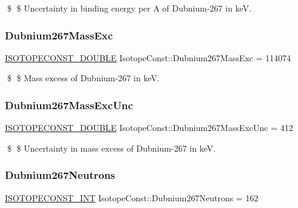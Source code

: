 \$ \$ Uncertainty in binding energy per A of Dubnium-\/267 in keV. \mbox{\label{group___isotope_const-_dubnium-_db267_ga7fd38a8ca58996b056b71a1d2e3cdb38}} 
\subsubsection{\texorpdfstring{Dubnium267\+Mass\+Exc}{Dubnium267MassExc}}
{\footnotesize\ttfamily \mbox{\hyperlink{group___isotope_const-_macros_ga8f45a7272ce02c0b4c65c44636ed719a}{I\+S\+O\+T\+O\+P\+E\+C\+O\+N\+S\+T\+\_\+\+D\+O\+U\+B\+LE}} Isotope\+Const\+::\+Dubnium267\+Mass\+Exc = 114074}

\$ \$ Mass excess of Dubnium-\/267 in keV. \mbox{\label{group___isotope_const-_dubnium-_db267_gad4cf3b018f2bd5d7bee70d825d6aa78c}} 
\subsubsection{\texorpdfstring{Dubnium267\+Mass\+Exc\+Unc}{Dubnium267MassExcUnc}}
{\footnotesize\ttfamily \mbox{\hyperlink{group___isotope_const-_macros_ga8f45a7272ce02c0b4c65c44636ed719a}{I\+S\+O\+T\+O\+P\+E\+C\+O\+N\+S\+T\+\_\+\+D\+O\+U\+B\+LE}} Isotope\+Const\+::\+Dubnium267\+Mass\+Exc\+Unc = 412}

\$ \$ Uncertainty in mass excess of Dubnium-\/267 in keV. \mbox{\label{group___isotope_const-_dubnium-_db267_gab4e56055e82b29fcd496819a36593d8d}} 
\subsubsection{\texorpdfstring{Dubnium267\+Neutrons}{Dubnium267Neutrons}}
{\footnotesize\ttfamily \mbox{\hyperlink{group___isotope_const-_macros_ga5f18360b3e99483a35c32d789e62621c}{I\+S\+O\+T\+O\+P\+E\+C\+O\+N\+S\+T\+\_\+\+I\+NT}} Isotope\+Const\+::\+Dubnium267\+Neutrons = 162}

